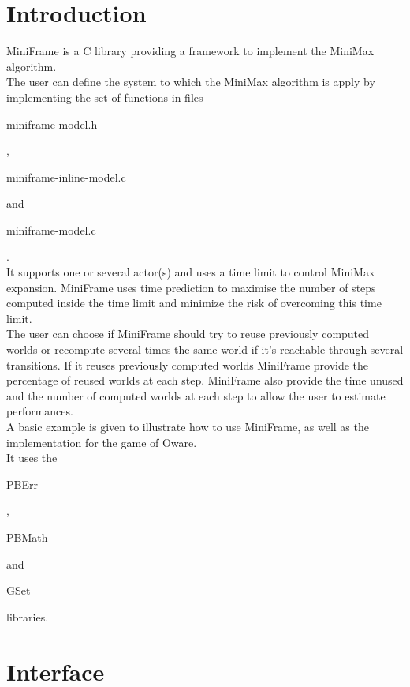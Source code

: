 \section*{Introduction}

MiniFrame is a C library providing a framework to implement the MiniMax algorithm.\\ 

The user can define the system to which the MiniMax algorithm is apply by implementing the set of functions in files \begin{ttfamily}miniframe-model.h\end{ttfamily}, \begin{ttfamily}miniframe-inline-model.c\end{ttfamily} and \begin{ttfamily}miniframe-model.c\end{ttfamily}.\\

It supports one or several actor(s) and uses a time limit to control MiniMax expansion. MiniFrame uses time prediction to maximise the number of steps computed inside the time limit and minimize the risk of overcoming this time limit.\\

The user can choose if MiniFrame should try to reuse previously computed worlds or recompute several times the same world if it's reachable through several transitions. If it reuses previously computed worlds MiniFrame provide the percentage of reused worlds at each step. MiniFrame also provide the time unused and the number of computed worlds at each step to allow the user to estimate performances.\\

A basic example is given to illustrate how to use MiniFrame, as well as the implementation for the game of Oware.\\

It uses the \begin{ttfamily}PBErr\end{ttfamily}, \begin{ttfamily}PBMath\end{ttfamily} and \begin{ttfamily}GSet\end{ttfamily} libraries.\\

\section{Interface}

